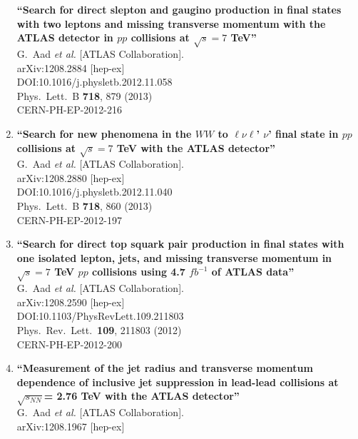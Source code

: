 \documentclass{article}
\begin{document}
\begin{enumerate}
{\bf ``Search for direct slepton and gaugino production in final states with two leptons and missing transverse momentum with the ATLAS detector in $pp$ collisions at $\sqrt{s}=7$ TeV''}
  \\{}G.~Aad {\it et al.} [ATLAS Collaboration].
  \\{}arXiv:1208.2884 [hep-ex]
  \\{}DOI:10.1016/j.physletb.2012.11.058
  \\{}Phys.\ Lett.\ B {\bf 718}, 879 (2013)
  \\{}CERN-PH-EP-2012-216
\item%
{\bf ``Search for new phenomena in the $W W$ to $\ell \nu \ell$' $\nu$' final state in $pp$ collisions at $\sqrt{s}=7$ TeV with the ATLAS detector''}
  \\{}G.~Aad {\it et al.} [ATLAS Collaboration].
  \\{}arXiv:1208.2880 [hep-ex]
  \\{}DOI:10.1016/j.physletb.2012.11.040
  \\{}Phys.\ Lett.\ B {\bf 718}, 860 (2013)
  \\{}CERN-PH-EP-2012-197
\item%
{\bf ``Search for direct top squark pair production in final states with one isolated lepton, jets, and missing transverse momentum in $\sqrt{s}=7$ TeV $pp$ collisions using 4.7 $fb^{-1}$ of ATLAS data''}
  \\{}G.~Aad {\it et al.} [ATLAS Collaboration].
  \\{}arXiv:1208.2590 [hep-ex]
  \\{}DOI:10.1103/PhysRevLett.109.211803
  \\{}Phys.\ Rev.\ Lett.\  {\bf 109}, 211803 (2012)
  \\{}CERN-PH-EP-2012-200
\item%
{\bf ``Measurement of the jet radius and transverse momentum dependence of inclusive jet suppression in lead-lead collisions at $\sqrt{s_{NN}}$= 2.76 TeV with the ATLAS detector''}
  \\{}G.~Aad {\it et al.} [ATLAS Collaboration].
  \\{}arXiv:1208.1967 [hep-ex]

\end{enumerate}
\end{document}
